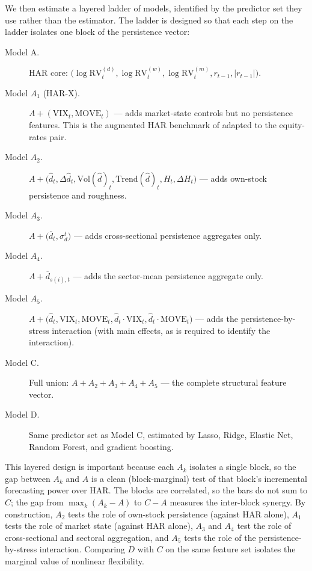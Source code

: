 \documentclass[11pt,a4paper]{article}
\newcommand{\RV}{\mathrm{RV}}
\newcommand{\VIX}{\mathrm{VIX}}
\newcommand{\dhat}{\hat d}
\begin{document}
We then estimate a layered ladder of models, identified by the predictor
set they use rather than the estimator. The ladder is designed so that
each step on the ladder isolates one block of the persistence vector:
\begin{description}
\item[Model A.] HAR core: $\bigl(\log\RV^{(d)}_t,\log\RV^{(w)}_t,
  \log\RV^{(m)}_t,r_{t-1},|r_{t-1}|\bigr)$.
\item[Model $A_1$ (HAR-X).] $A + (\VIX_t,\mathrm{MOVE}_t)$ --- adds
  market-state controls but no persistence features. This is the
  augmented HAR benchmark of \citet{bollerslev2009common} adapted to
  the equity-rates pair.
\item[Model $A_2$.] $A + \bigl(\dhat_t,\Delta\dhat_t,
  \mathrm{Vol}(\dhat)_t,\mathrm{Trend}(\dhat)_t,H_t,\Delta H_t\bigr)$
  --- adds own-stock persistence and roughness.
\item[Model $A_3$.] $A + \bigl(\overline d_t,\sigma_d^t\bigr)$ --- adds
  cross-sectional persistence aggregates only.
\item[Model $A_4$.] $A + \overline d_{s(i),t}$ --- adds the sector-mean
  persistence aggregate only.
\item[Model $A_5$.] $A + \bigl(\dhat_t,\VIX_t,\mathrm{MOVE}_t,
  \dhat_t\!\cdot\!\VIX_t,\dhat_t\!\cdot\!\mathrm{MOVE}_t\bigr)$ ---
  adds the persistence-by-stress interaction (with main effects, as is
  required to identify the interaction).
\item[Model C.] Full union: $A + A_2 + A_3 + A_4 + A_5$ --- the complete
  structural feature vector.
\item[Model D.] Same predictor set as Model C, estimated by Lasso, Ridge,
  Elastic Net, Random Forest, and gradient boosting.
\end{description}

This layered design is important because each $A_k$ isolates a single
block, so the gap between $A_k$ and $A$ is a clean (block-marginal)
test of that block's incremental forecasting power over HAR. The blocks
are correlated, so the bars do not sum to $C$; the gap from
$\max_k(A_k - A)$ to $C - A$ measures the inter-block synergy. By
construction, $A_2$ tests the role of own-stock persistence (against
HAR alone), $A_1$ tests the role of market state (against HAR alone),
$A_3$ and $A_4$ test the role of cross-sectional and sectoral
aggregation, and $A_5$ tests the role of the persistence-by-stress
interaction. Comparing $D$ with $C$ on the same feature set isolates
the marginal value of nonlinear flexibility.
\end{document}
